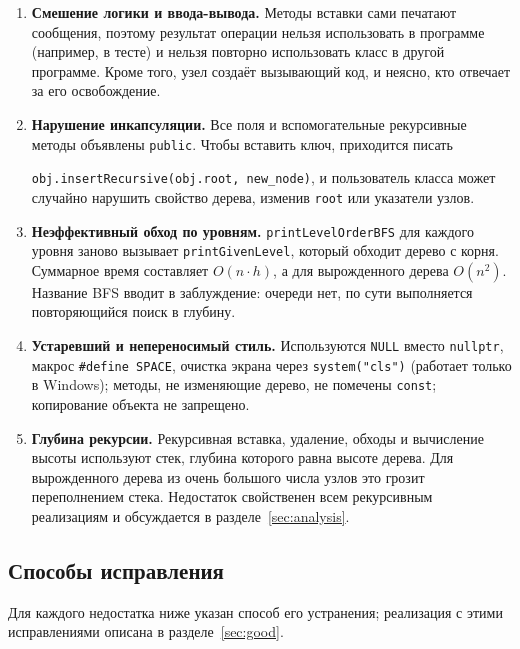 \documentclass[otchet]{SCWorks}
\begin{document}
\begin{enumerate}
  \item \textbf{Смешение логики и ввода-вывода.} Методы вставки сами
        печатают сообщения, поэтому результат операции нельзя использовать
        в программе (например, в тесте) и нельзя повторно использовать класс
        в другой программе. Кроме того, узел создаёт вызывающий код, и
        неясно, кто отвечает за его освобождение.

  \item \textbf{Нарушение инкапсуляции.} Все поля и вспомогательные
        рекурсивные методы объявлены \texttt{public}. Чтобы вставить ключ,
        приходится писать 
		
		\texttt{obj.insertRecursive(obj.root, new\_node)}, и пользователь класса 
		может случайно нарушить свойство дерева, изменив \texttt{root} или указатели узлов.

  \item \textbf{Неэффективный обход по уровням.}
        \texttt{printLevelOrderBFS} для каждого уровня заново вызывает
        \texttt{printGivenLevel}, который обходит дерево с корня. Суммарное
        время составляет $O(n\cdot h)$, а для вырожденного дерева
        $O(n^2)$. Название BFS вводит в заблуждение: очереди нет, по сути
        выполняется повторяющийся поиск в глубину.

  \item \textbf{Устаревший и непереносимый стиль.} Используются
        \texttt{NULL} вместо \texttt{nullptr}, макрос
        \texttt{\#define SPACE}, очистка экрана через
        \texttt{system("cls")} (работает только в Windows); методы, не
        изменяющие дерево, не помечены \texttt{const}; копирование объекта
        не запрещено.

  \item \textbf{Глубина рекурсии.} Рекурсивная вставка, удаление, обходы и
        вычисление высоты используют стек, глубина которого равна высоте
        дерева. Для вырожденного дерева из очень большого числа узлов
        это грозит переполнением стека. Недостаток свойственен всем
        рекурсивным реализациям и обсуждается в разделе~\ref{sec:analysis}.
\end{enumerate}

\subsection{Способы исправления}

Для каждого недостатка ниже указан способ его устранения; реализация с
этими исправлениями описана в разделе~\ref{sec:good}.
\end{document}
